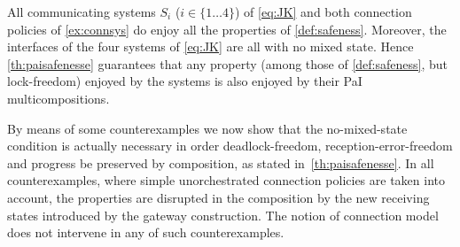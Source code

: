 \medskip
\noindent



\smallskip
All communicating systems $S_i$ ($i \in \{1\ldots 4\}$) of \cref{eq:JK} %
and both connection policies of \cref{ex:connsys} do enjoy all the properties of \cref{def:safeness}.
Moreover, the interfaces of the four systems of  \cref{eq:JK} %
are all with no mixed state.
Hence \cref{th:paisafenesse} guarantees that
any property (among those of \cref{def:safeness}, but lock-freedom) enjoyed by the systems is also enjoyed by
their PaI multicompositions.

\smallskip


By means of some counterexamples we now show that
the no-mixed-state condition is actually necessary in order
deadlock-freedom, reception-error-freedom and progress be preserved by composition, as stated 
in~\cref{th:paisafenesse}.
In all counterexamples, where simple unorchestrated connection policies are taken into account, the properties are disrupted in the composition by the new receiving states introduced by the gateway construction. The notion of connection model does not intervene in any of such counterexamples. 


